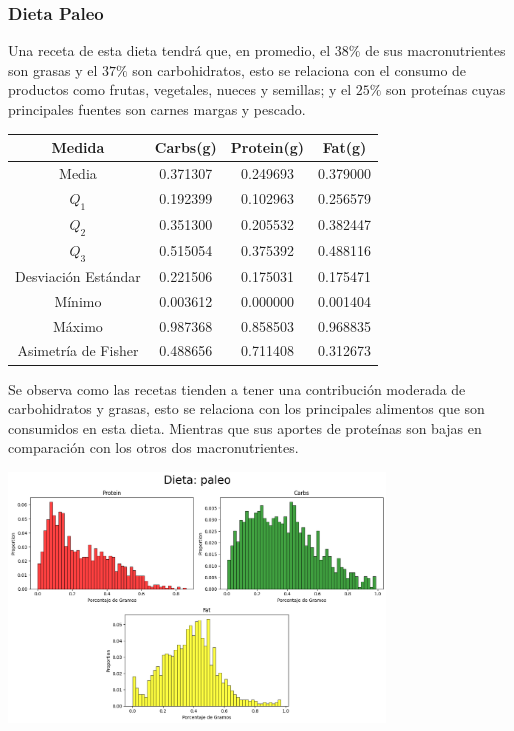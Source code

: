 \documentclass[12pt,a4paper]{article}
\begin{document}
    \subsubsection{Dieta Paleo}
        Una receta de esta dieta tendrá que, en promedio, el $38\%$ de sus 
        macronutrientes son grasas y el $37\%$ son carbohidratos, esto se 
        relaciona con el consumo de productos como frutas, vegetales, nueces 
        y semillas; y el $25\%$ son proteínas cuyas principales fuentes son 
        carnes margas y pescado.
        \begin{center}
            \begin{tabular}{|c|ccc|}
                \hline
                Medida & Carbs(g) & Protein(g) & Fat(g) \\
                \hline
                Media               & 0.371307 & 0.249693 & 0.379000  \\
                $Q_1$               & 0.192399 & 0.102963 & 0.256579  \\
                $Q_2$               & 0.351300 & 0.205532 & 0.382447  \\
                $Q_3$               & 0.515054 & 0.375392 & 0.488116  \\
                Desviación Estándar & 0.221506 & 0.175031 & 0.175471  \\
                Mínimo              & 0.003612 & 0.000000 & 0.001404  \\
                Máximo              & 0.987368 & 0.858503 & 0.968835  \\
                Asimetría de Fisher & 0.488656 & 0.711408 & 0.312673  \\
                \hline
            \end{tabular}
        \end{center}
        Se observa como las recetas tienden a tener una contribución moderada de 
        carbohidratos y grasas, esto se relaciona con los principales alimentos 
        que son consumidos en esta dieta. Mientras que sus aportes de proteínas 
        son bajas en comparación con los otros dos macronutrientes.
        \begin{center}
            \includegraphics[width=0.75\textwidth]{Resources/2_03_plot_04.png}
        \end{center}
\end{document}
